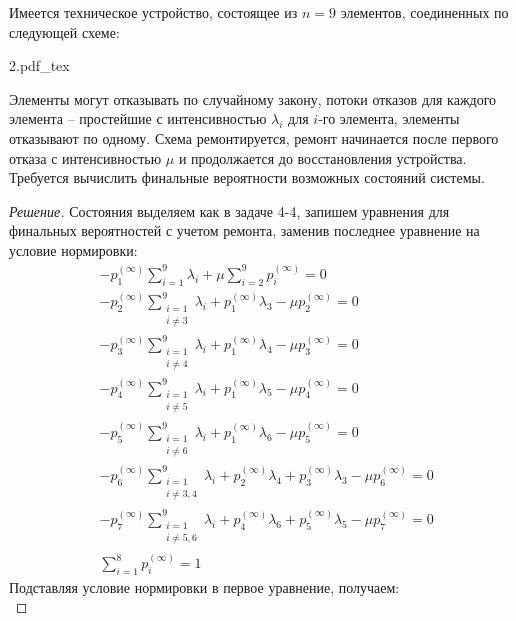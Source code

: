 \documentclass[12pt,a4paper]{article}
\newcommand{\incfig}[1]{%
	\def\svgwidth{\columnwidth}
	{#1.pdf_tex}
}
\begin{document}
\newpage

\begin{exercise}[Задача 4-5]
	Имеется техническое устройство, состоящее из $n = 9$ элементов, соединенных по следующей схеме:
	
	\incfig{2}
	
	Элементы могут отказывать по случайному закону, потоки отказов для каждого элемента -- простейшие с интенсивностью $\lambda_i$ для $i$-го элемента, элементы отказывают по одному. Схема ремонтируется, ремонт начинается после первого отказа с интенсивностью $\mu$ и продолжается до восстановления устройства. Требуется вычислить финальные вероятности возможных состояний системы.
\end{exercise}
\begin{proof}[Решение]
	Состояния выделяем как в задаче 4-4, запишем уравнения для финальных вероятностей с учетом ремонта, заменив последнее уравнение на условие нормировки:
	\begin{align*}
	&-p_1^{(\infty)} \sum_{i=1}^{9}{\lambda_i} + \mu \sum_{i=2}^{9}{p_i^{(\infty)}}= 0\\
	&-p_2^{(\infty)} \sum_{\substack{i = 1 \\ i \neq 3}}^{9}{\lambda_i} + p_1^{(\infty)} \lambda_3 - \mu p_2^{(\infty)}= 0 \\
	&-p_3^{(\infty)} \sum_{\substack{i = 1 \\ i \neq 4}}^{9}{\lambda_i} + p_1^{(\infty)} \lambda_4 - \mu p_3^{(\infty)} = 0 \\
	&-p_4^{(\infty)} \sum_{\substack{i = 1 \\ i \neq 5}}^{9}{\lambda_i} + p_1^{(\infty)} \lambda_5 - \mu p_4^{(\infty)} = 0 \\
	&-p_5^{(\infty)} \sum_{\substack{i = 1 \\ i \neq 6}}^{9}{\lambda_i} + p_1^{(\infty)} \lambda_6 - \mu p_5^{(\infty)} = 0 \\
	&-p_6^{(\infty)} \sum_{\substack{i = 1 \\ i \neq 3, 4}}^{9}{\lambda_i} + p_2^{(\infty)} \lambda_4 + p_3^{(\infty)} \lambda_3 - \mu p_6^{(\infty)} = 0 \\
	&-p_7^{(\infty)} \sum_{\substack{i = 1 \\ i \neq 5, 6}}^{9}{\lambda_i} + p_4^{(\infty)} \lambda_6 + p_5^{(\infty)} \lambda_5 - \mu p_7^{(\infty)} = 0 \\
	&\sum_{i=1}^{8}{p_i^{(\infty)}} = 1
	\end{align*}
	Подставляя условие нормировки в первое уравнение, получаем:
	\begin{equation*}

\end{equation*}
\end{proof}
\end{document}
